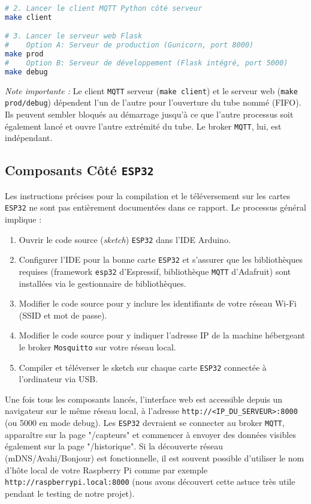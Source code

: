 \documentclass[12pt]{article}
\begin{document}
\begin{enumerate}
\begin{lstlisting}[language=bash]
# 2. Lancer le client MQTT Python côté serveur
make client

# 3. Lancer le serveur web Flask
#    Option A: Serveur de production (Gunicorn, port 8000)
make prod
#    Option B: Serveur de développement (Flask intégré, port 5000)
make debug
        \end{lstlisting}
        \textit{Note importante :} Le client \texttt{MQTT} serveur (\texttt{make client}) et le serveur web (\texttt{make prod/debug}) dépendent l'un de l'autre pour l'ouverture du tube nommé (FIFO). Ils peuvent sembler bloqués au démarrage jusqu'à ce que l'autre processus soit également lancé et ouvre l'autre extrémité du tube. Le broker \texttt{MQTT}, lui, est indépendant.
\end{enumerate}

\subsection{Composants Côté \texttt{ESP32}}

Les instructions précises pour la compilation et le téléversement sur les cartes \texttt{ESP32} ne sont pas entièrement documentées dans ce rapport. Le processus général implique :
\begin{enumerate}
    \item Ouvrir le code source (\textit{sketch}) \texttt{ESP32} dans l'IDE Arduino.
    \item Configurer l'IDE pour la bonne carte \texttt{ESP32} et s'assurer que les bibliothèques requises (framework \texttt{esp32} d'Espressif, bibliothèque \texttt{MQTT} d'Adafruit) sont installées via le gestionnaire de bibliothèques.
    \item Modifier le code source pour y inclure les identifiants de votre réseau Wi-Fi (SSID et mot de passe).
    \item Modifier le code source pour y indiquer l'adresse IP de la machine hébergeant le broker \texttt{Mosquitto} sur votre réseau local.
    \item Compiler et téléverser le sketch sur chaque carte \texttt{ESP32} connectée à l'ordinateur via USB.
\end{enumerate} \hfill \break

Une fois tous les composants lancés, l'interface web est accessible depuis un navigateur sur le même réseau local, à l'adresse \texttt{http://<IP\_DU\_SERVEUR>:8000} (ou 5000 en mode debug). Les \texttt{ESP32} devraient se connecter au broker \texttt{MQTT}, apparaître sur la page "/capteurs" et commencer à envoyer des données visibles également sur la page "/historique". Si la découverte réseau (mDNS/Avahi/Bonjour) est fonctionnelle, il est souvent possible d'utiliser le nom d'hôte local de votre Raspberry Pi comme par exemple \texttt{http://raspberrypi.local:8000} (nous avons découvert cette astuce très utile pendant le testing de notre projet).
\end{document}
